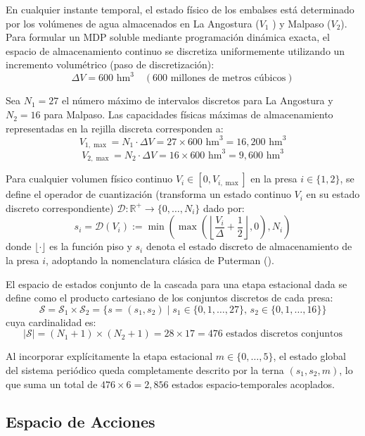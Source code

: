 \documentclass[
  spanish,
  letterpaper,
]{scrreprt}
\theoremstyle{definition}
\theoremstyle{remark}
\begin{document}
En cualquier instante temporal, el estado físico de los embalses está
determinado por los volúmenes de agua almacenados en La Angostura
(\(V_1\) ) y Malpaso (\(V_{2}\)). Para formular un MDP soluble mediante
programación dinámica exacta, el espacio de almacenamiento continuo se
discretiza uniformemente utilizando un incremento volumétrico (paso de
discretización):
\[\Delta V = 600\text{ hm}^3 \quad (600\text{ millones de metros cúbicos})\]

Sea \(N_1 = 27\) el número máximo de intervalos discretos para La
Angostura y \(N_2 = 16\) para Malpaso. Las capacidades físicas máximas
de almacenamiento representadas en la rejilla discreta corresponden a:
\[V_{1,\max} = N_1 \cdot \Delta V = 27 \times 600\text{ hm}^3 = 16,200\text{ hm}^3\]
\[V_{2,\max} = N_2 \cdot \Delta V = 16 \times 600\text{ hm}^3 = 9,600\text{ hm}^3\]

Para cualquier volumen físico continuo \(V_{i} \in [0, V_{i,\max}]\) en
la presa \(i \in \{1, 2\}\), se define el operador de cuantización
(transforma un estado continuo \(V_i\) en su estado discreto
correspondiente) \(\mathcal{D} : \mathbb{R}^+ \to \{0, \dots, N_i\}\)
dado por:
\[s_i = \mathcal{D}(V_{i}) := \min\left(\max\left(\left\lfloor \frac{V_{i}}{\Delta} + \frac{1}{2} \right\rfloor, 0\right), N_i\right) \label{eq:operador-discretizacion}\]
donde \(\lfloor \cdot \rfloor\) es la función piso y \(s_i\) denota el
estado discreto de almacenamiento de la presa \(i\), adoptando la
nomenclatura clásica de Puterman
().

El espacio de estados conjunto de la cascada para una etapa estacional
dada se define como el producto cartesiano de los conjuntos discretos de
cada presa:
\[\mathcal{S} = \mathcal{S}_1 \times \mathcal{S}_2 = \big\{ s = (s_1, s_2) \mid s_1 \in \{0, 1, \dots, 27\}, \, s_2 \in \{0, 1, \dots, 16\} \big\}\]
cuya cardinalidad es:
\[|\mathcal{S}| = (N_1 + 1) \times (N_2 + 1) = 28 \times 17 = 476\text{ estados discretos conjuntos}\]

Al incorporar explícitamente la etapa estacional
\(m \in \{0, \dots, 5\}\), el estado global del sistema periódico queda
completamente descrito por la terna \((s_1, s_2, m)\), lo que suma un
total de \(476 \times 6 = 2,856\) estados espacio-temporales acoplados.

\subsection{Espacio de Acciones}\label{espacio-de-acciones}
\end{document}
